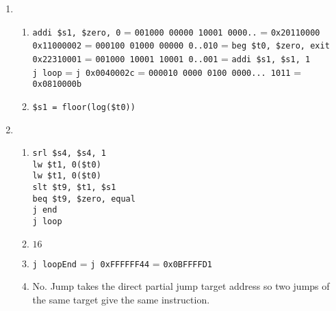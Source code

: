 \documentclass[12pt, a4paper]{article}
\begin{document}
\begin{enumerate}[Q\arabic*.]
  \item 
    \begin{enumerate}[(\alph*.)]
      \item \lstinline|addi $s1, $zero, 0| = \lstinline|001000 00000 10001 0000..| = \lstinline|0x20110000|\\
        \lstinline|0x11000002| = \lstinline|000100 01000 00000 0..010| = \lstinline|beg $t0, $zero, exit|\\
        \lstinline|0x22310001| = \lstinline|001000 10001 10001 0..001| = \lstinline|addi $s1, $s1, 1|\\
        \lstinline|j loop| = \lstinline|j 0x0040002c| = \lstinline|000010 0000 0100 0000... 1011| = \lstinline|0x0810000b|\\

      \item \lstinline|$s1 = floor(log($t0))|
    \end{enumerate}

  \pagebreak

  \item 
    \begin{enumerate}[(\alph*.)]
      \item \lstinline|srl $s4, $s4, 1|\\
        \lstinline|lw $t1, 0($t0)|\\
        \lstinline|lw $t1, 0($t0)|\\
        \lstinline|slt $t9, $t1, $s1|\\
        \lstinline|beq $t9, $zero, equal|\\
        \lstinline|j end|\\
        \lstinline|j loop|\\
      
      \item $16$

      \item \lstinline|j loopEnd| = \lstinline|j 0xFFFFFF44| = \lstinline|0x0BFFFFD1|

      \item No. Jump takes the direct partial jump target address so two jumps of the same target give the same instruction.
    \end{enumerate}
\end{enumerate}
\end{document}

